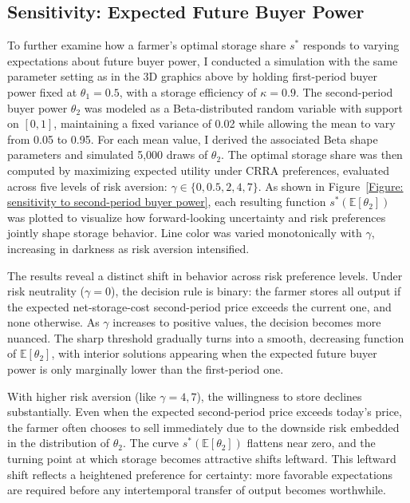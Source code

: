 \subsection{Sensitivity: Expected Future Buyer Power}
\noindent To further examine how a farmer’s optimal storage share $s^*$ responds to varying expectations about future buyer power, I conducted a simulation with the same parameter setting as in the 3D graphics above by holding first-period buyer power fixed at $\theta_1 = 0.5$, with a storage efficiency of $\kappa = 0.9$. The second-period buyer power $\theta_2$ was modeled as a Beta-distributed random variable with support on $[0, 1]$, maintaining a fixed variance of 0.02 while allowing the mean to vary from 0.05 to 0.95. For each mean value, I derived the associated Beta shape parameters and simulated 5,000 draws of $\theta_2$. The optimal storage share was then computed by maximizing expected utility under CRRA preferences, evaluated across five levels of risk aversion: $\gamma \in \{0, 0.5, 2, 4, 7\}$. As shown in Figure~\ref{Figure: sensitivity to second-period buyer power}, each resulting function $s^*(\mathbb{E}[\theta_2])$ was plotted to visualize how forward-looking uncertainty and risk preferences jointly shape storage behavior. Line color was varied monotonically with $\gamma$, increasing in darkness as risk aversion intensified.

The results reveal a distinct shift in behavior across risk preference levels. Under risk neutrality ($\gamma = 0$), the decision rule is binary: the farmer stores all output if the expected net-storage-cost second-period price exceeds the current one, and none otherwise. As $\gamma$ increases to positive values, the decision becomes more nuanced. The sharp threshold gradually turns into a smooth, decreasing function of $\mathbb{E}[\theta_2]$, with interior solutions appearing when the expected future buyer power is only marginally lower than the first-period one.


With higher risk aversion (like $\gamma = 4, 7$), the willingness to store declines substantially. Even when the expected second-period price exceeds today's price, the farmer often chooses to sell immediately due to the downside risk embedded in the distribution of $\theta_2$. The curve $s^*(\mathbb{E}[\theta_2])$ flattens near zero, and the turning point at which storage becomes attractive shifts leftward. This leftward shift reflects a heightened preference for certainty: more favorable expectations are required before any intertemporal transfer of output becomes worthwhile. 


